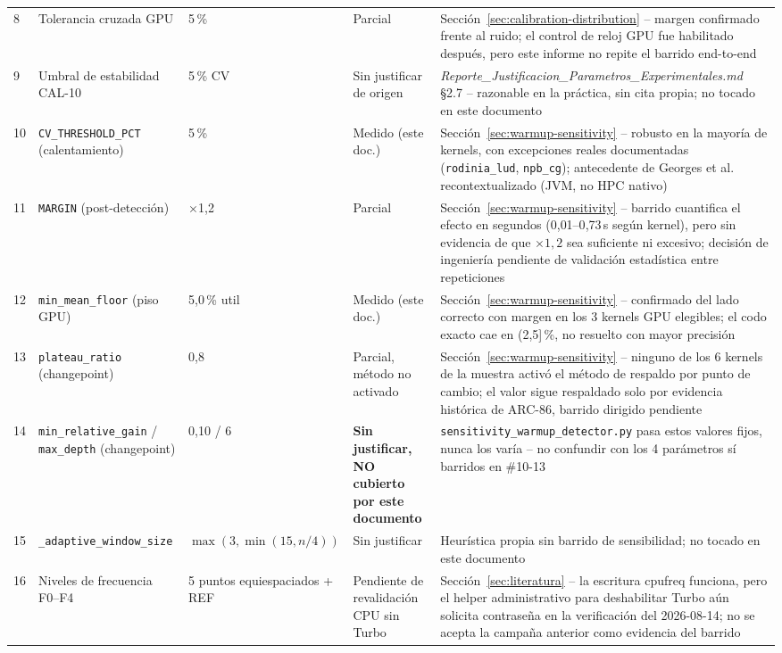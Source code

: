 \begin{longtable}{@{}p{}p{}p{}p{}p{}@{}}
8  & Tolerancia cruzada GPU & 5\,\% & Parcial & Sección~\ref{sec:calibration-distribution} -- margen confirmado frente al ruido; el control de reloj GPU fue habilitado después, pero este informe no repite el barrido end-to-end \\
9  & Umbral de estabilidad CAL-10 & 5\,\% CV & Sin justificar de origen & \emph{Reporte\_Justificacion\_Parametros\_Experimentales.md} §2.7 -- razonable en la práctica, sin cita propia; no tocado en este documento \\
10 & \texttt{CV\_THRESHOLD\_PCT} (calentamiento) & 5\,\% & Medido (este doc.) & Sección~\ref{sec:warmup-sensitivity} -- robusto en la mayoría de kernels, con excepciones reales documentadas (\texttt{rodinia\_lud}, \texttt{npb\_cg}); antecedente de Georges et al. recontextualizado (JVM, no HPC nativo) \\
11 & \texttt{MARGIN} (post-detección) & $\times$1{,}2 & Parcial & Sección~\ref{sec:warmup-sensitivity} -- barrido cuantifica el efecto en segundos (0{,}01--0{,}73\,s según kernel), pero sin evidencia de que $\times 1{,}2$ sea suficiente ni excesivo; decisión de ingeniería pendiente de validación estadística entre repeticiones \\
12 & \texttt{min\_mean\_floor} (piso GPU) & 5{,}0\,\% util & Medido (este doc.) & Sección~\ref{sec:warmup-sensitivity} -- confirmado del lado correcto con margen en los 3 kernels GPU elegibles; el codo exacto cae en (2,5]\,\%, no resuelto con mayor precisión \\
13 & \texttt{plateau\_ratio} (changepoint) & 0{,}8 & Parcial, método no activado & Sección~\ref{sec:warmup-sensitivity} -- ninguno de los 6 kernels de la muestra activó el método de respaldo por punto de cambio; el valor sigue respaldado solo por evidencia histórica de ARC-86, barrido dirigido pendiente \\
14 & \texttt{min\_relative\_gain} / \texttt{max\_depth} (changepoint) & 0{,}10 / 6 & \textbf{Sin justificar, NO cubierto por este documento} & \texttt{sensitivity\_warmup\_detector.py} pasa estos valores fijos, nunca los varía -- no confundir con los 4 parámetros sí barridos en \#10-13 \\
15 & \texttt{\_adaptive\_window\_size} & $\max(3,\min(15,n/4))$ & Sin justificar & Heurística propia sin barrido de sensibilidad; no tocado en este documento \\
16 & Niveles de frecuencia F0--F4 & 5 puntos equiespaciados + REF & Pendiente de revalidación CPU sin Turbo & Sección~\ref{sec:literatura} -- la escritura cpufreq funciona, pero el helper administrativo para deshabilitar Turbo aún solicita contraseña en la verificación del 2026-08-14; no se acepta la campaña anterior como evidencia del barrido \\

\end{longtable}
